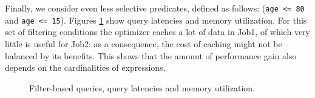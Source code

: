 Finally, we consider even less selective predicates, defined as follows: (\texttt{age <= 80} and \texttt{age <= 15}). Figures \ref{fig:query1_80_15} show query latencies and memory utilization. For this set of filtering conditions the optimizer caches a lot of data in Job1, of which very little is useful for Job2: as a consequence, the cost of caching might not be balanced by its benefits. This shows that the amount of performance gain also depends on the cardinalities of expressions.

\begin{figure}[!htb]
	\centering



   \caption{Filter-based queries, query latencies and memory utilization.}
   \label{fig:query1_80_15}
\end{figure}

